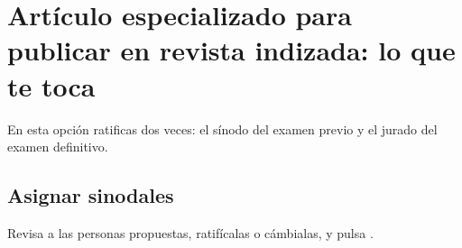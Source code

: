\section{Artículo especializado para publicar en revista indizada: lo que te toca}
En esta opción ratificas dos veces: el sínodo del examen previo y el jurado del examen definitivo.
\subsection{Asignar sinodales}
Revisa a las personas propuestas, ratifícalas o cámbialas, y pulsa .
